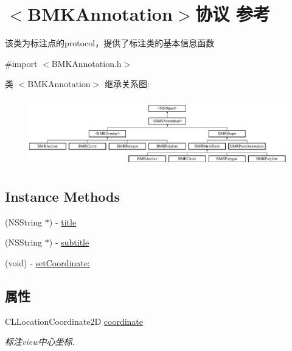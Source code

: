 \hypertarget{protocol_b_m_k_annotation-p}{\section{$<$B\+M\+K\+Annotation$>$协议 参考}
\label{protocol_b_m_k_annotation-p}
}


该类为标注点的protocol，提供了标注类的基本信息函数  




{\ttfamily \#import $<$B\+M\+K\+Annotation.\+h$>$}

类 $<$B\+M\+K\+Annotation$>$ 继承关系图\+:\begin{figure}[H]
\begin{center}
\leavevmode
\includegraphics[height=2.962963cm]{protocol_b_m_k_annotation-p}
\end{center}
\end{figure}
\subsection*{Instance Methods}
\begin{DoxyCompactItemize}
\item 
(N\+S\+String $\ast$) -\/ \hyperlink{protocol_b_m_k_annotation-p_a249e1b880f8ded8541a0fe59ef4abb12}{title}
\item 
(N\+S\+String $\ast$) -\/ \hyperlink{protocol_b_m_k_annotation-p_a62aea71f4631251330e8a6fc3d3bdf11}{subtitle}
\item 
(void) -\/ \hyperlink{protocol_b_m_k_annotation-p_a86db1788af78d273e1e155d3aa3d978f}{set\+Coordinate\+:}
\end{DoxyCompactItemize}
\subsection*{属性}
\begin{DoxyCompactItemize}
\item 
\hypertarget{protocol_b_m_k_annotation-p_ab7ed7fd80fc518acf82cf0048490f9be}{C\+L\+Location\+Coordinate2\+D \hyperlink{protocol_b_m_k_annotation-p_ab7ed7fd80fc518acf82cf0048490f9be}{coordinate}}\label{protocol_b_m_k_annotation-p_ab7ed7fd80fc518acf82cf0048490f9be}

\begin{DoxyCompactList}\small\item\em 标注view中心坐标. \end{DoxyCompactList}\end{DoxyCompactItemize}



